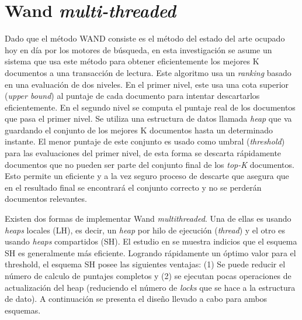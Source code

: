 \begin{table}[!th]
\begin{tabular}{| l | l | l |}
  
\end{tabular}


\end{table}

 





\section{Wand \textit{multi-threaded}}
\label{scheduling:wm}
Dado que el método WAND \citep{Broder:2003} consiste es el método del estado del arte ocupado hoy en día por los motores de búsqueda, en esta investigación se asume un sistema que usa este método para obtener eficientemente los mejores K documentos a una transacción de lectura. Este algoritmo usa un \textit{ranking} basado en una evaluación de dos niveles. En el primer nivel, este usa una cota superior (\textit{upper bound}) al puntaje de cada documento para intentar descartarlos eficientemente. En el segundo nivel se computa el puntaje real de los documentos que pasa el primer nivel. Se utiliza una estructura de datos llamada \textit{heap} que va guardando el conjunto de los mejores K documentos hasta un determinado instante. El menor puntaje de este conjunto es usado como umbral (\textit{threshold}) para las evaluaciones del primer nivel, de esta forma se descarta rápidamente documentos que no pueden ser parte del conjunto final de los \textit{top-K} documentos. Esto permite un eficiente y a la vez seguro proceso de descarte que asegura que en el resultado final se encontrará el conjunto correcto y no se perderán documentos relevantes.

Existen dos formas de implementar Wand \textit{multithreaded}. Una de ellas es usando \textit{heaps} locales (LH), es decir, un \textit{heap} por hilo de ejecución (\textit{thread}) y el otro es usando \textit{heaps} compartidos (SH). El estudio en \citep{Rojas:2013} se muestra indicios que el esquema SH es generalmente más eficiente. Logrando rápidamente un óptimo valor para el threshold, el esquema SH posee las siguientes ventajas: (1) Se puede reducir el número de calculo de puntajes completos y (2) se ejecutan pocas operaciones de actualización del heap (reduciendo el número de \textit{locks} que se hace a la estructura de dato). A continuación se presenta el diseño llevado a cabo para ambos esquemas.

